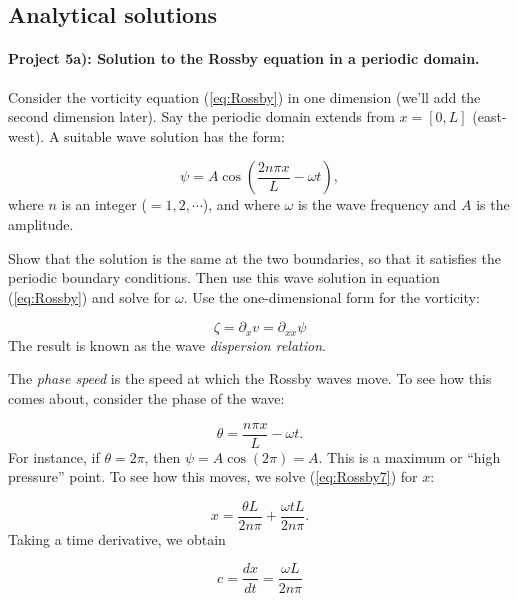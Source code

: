 \documentclass[%
oneside,                 %
final,                   %
10pt]{article}
\begin{document}
\subsection{Analytical solutions}

\paragraph{Project 5a): Solution to the Rossby equation in a periodic domain.}
Consider the vorticity equation (\ref{eq:Rossby}) in one dimension
(we'll add the second dimension later). Say the periodic domain
extends from $x=[0,L]$ (east-west). A suitable wave solution has the
form:

\begin{equation}
  \label{eq:Rossby5}
	\psi = A \cos(\frac{2n\pi x}{L} - \omega t), 
\end{equation}
where $n$ is an integer ($=1,2,\cdots$), and where $\omega$ is the
wave frequency and $A$ is the amplitude.

Show that the solution is the same at the two boundaries, so that it
satisfies the periodic boundary conditions. Then use this wave solution
in equation (\ref{eq:Rossby}) and solve for $\omega$. Use the
one-dimensional form for the vorticity:

\begin{equation}
  \label{eq:Rossby6}
	\zeta = \partial_x v = \partial_{xx} \psi
\end{equation}
The result is known as the wave \emph{dispersion relation}.

The \emph{phase speed} is the speed at which the Rossby waves move. To see how this comes about, consider the phase of the wave:

\begin{equation}
  \label{eq:Rossby7}
	\theta = \frac{n\pi x}{L} - \omega t.
\end{equation}
For instance, if $\theta=2\pi$, then $\psi = A\cos(2\pi) = A$. This is a maximum or ``high pressure'' point. To see how this moves, we solve (\ref{eq:Rossby7}) for $x$:

\begin{equation}
	x = \frac{\theta L}{2n\pi} + \frac{\omega tL}{2n\pi}.
\end{equation}
Taking a time derivative, we obtain

\begin{equation}
	c = \frac{dx}{dt} = \frac{\omega L}{2n\pi}
\end{equation}
\end{document}
